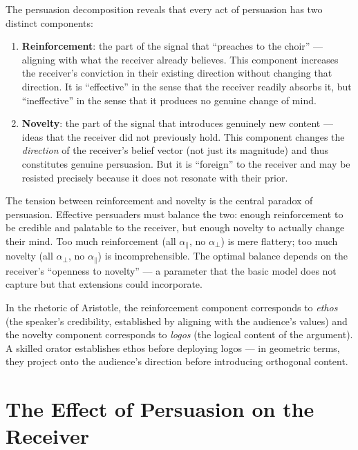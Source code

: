 \begin{interpretation}
\label{interp:dual-persuasion}
The persuasion decomposition reveals that every act of persuasion has two
distinct components:

\begin{enumerate}
\item \textbf{Reinforcement}: the part of the signal that ``preaches to the
choir'' --- aligning with what the receiver already believes. This component
increases the receiver's conviction in their existing direction without changing
that direction. It is ``effective'' in the sense that the receiver readily
absorbs it, but ``ineffective'' in the sense that it produces no genuine change
of mind.

\item \textbf{Novelty}: the part of the signal that introduces genuinely new
content --- ideas that the receiver did not previously hold. This component
changes the \emph{direction} of the receiver's belief vector (not just its
magnitude) and thus constitutes genuine persuasion. But it is ``foreign'' to
the receiver and may be resisted precisely because it does not resonate with
their prior.
\end{enumerate}

The tension between reinforcement and novelty is the central paradox of
persuasion. Effective persuaders must balance the two: enough reinforcement
to be credible and palatable to the receiver, but enough novelty to actually
change their mind. Too much reinforcement (all $\alpha_\parallel$, no
$\alpha_\perp$) is mere flattery; too much novelty (all $\alpha_\perp$, no
$\alpha_\parallel$) is incomprehensible. The optimal balance depends on the
receiver's ``openness to novelty'' --- a parameter that the basic model does
not capture but that extensions could incorporate.

In the rhetoric of Aristotle, the reinforcement component corresponds to
\emph{ethos} (the speaker's credibility, established by aligning with the
audience's values) and the novelty component corresponds to \emph{logos} (the
logical content of the argument). A skilled orator establishes ethos before
deploying logos --- in geometric terms, they project onto the audience's
direction before introducing orthogonal content.
\end{interpretation}


\section{The Effect of Persuasion on the Receiver}

